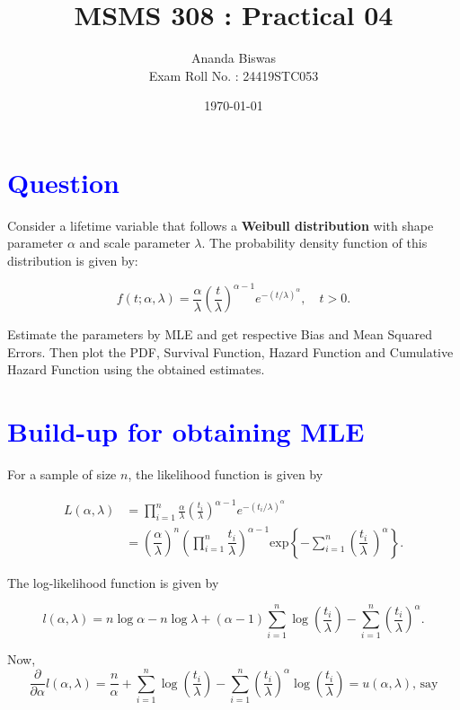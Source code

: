 \documentclass[11pt, a4paper]{article}\usepackage[]{graphicx}\usepackage[]{xcolor}
\title{MSMS 308 : Practical 04}
\author{Ananda Biswas \\[1em] Exam Roll No. : 24419STC053}
\date{\today}
\begin{document}
\maketitle


\section*{\faArrowAltCircleRight[regular] \textcolor{blue}{Question}}

\hspace{1cm} Consider a lifetime variable that follows a \textbf{Weibull distribution} with shape parameter $\alpha$ and scale parameter $\lambda$. The probability density function of this distribution is given by:

\[
f(t; \alpha, \lambda) = \frac{\alpha}{\lambda} \left( \frac{t}{\lambda} \right)^{\alpha - 1} e^{-(t/\lambda)^\alpha}, \quad t > 0.
\]

Estimate the parameters by MLE and get respective Bias and Mean Squared Errors. Then plot the PDF, Survival Function, Hazard Function and Cumulative Hazard Function using the obtained estimates.

\section*{\faArrowAltCircleRight[regular] \textcolor{blue}{Build-up for obtaining MLE}}

For a sample of size $n$, the likelihood function is given by

\begin{align*}
L(\alpha, \lambda) &= \prod \limits_{i = 1}^{n} \frac{\alpha}{\lambda} \left( \frac{t_i}{\lambda} \right)^{\alpha - 1} e^{-(t_i / \lambda)^\alpha} \\
&= \left( \dfrac{\alpha}{\lambda} \right)^n \left( \prod \limits_{i = 1}^{n}  \dfrac{t_i}{\lambda} \right)^{\alpha - 1} \text{exp}\left\{- \sum \limits_{i = 1}^{n} \left( \dfrac{t_i}{\lambda}\ \right)^{\alpha} \right\}.
\end{align*}

\vspace{0.5cm}

The log-likelihood function is given by

$$l(\alpha, \lambda) = n \log \alpha - n \log \lambda + (\alpha - 1) \sum_{i=1}^{n} \log \left( \frac{t_i}{\lambda} \right) - \sum_{i=1}^{n} \left( \frac{t_i}{\lambda} \right)^{\alpha}.$$

Now, 
\begin{equation}
\dfrac{\partial}{\partial \alpha} l(\alpha, \lambda) = \dfrac{n}{\alpha} + \sum \limits_{i=1}^{n} \log \left( \dfrac{t_i}{\lambda} \right) - \sum \limits_{i=1}^{n} \left( \dfrac{t_i}{\lambda} \right)^{\alpha} \log \left( \dfrac{t_i}{\lambda} \right) = u(\alpha, \lambda) \text{, say}
\end{equation}
\end{document}
